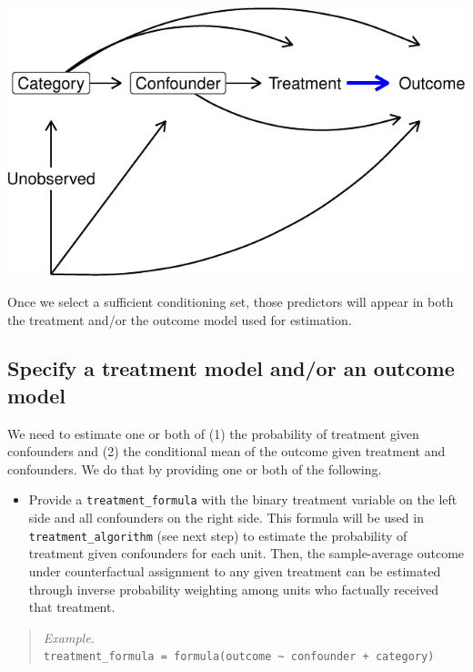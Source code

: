 \documentclass[
]{article}
\providecommand{\tightlist}{%
  \setlength{\itemsep}{0pt}\setlength{\parskip}{0pt}}
\begin{document}
\includegraphics{github_doc_files/figure-latex/unnamed-chunk-18-1.pdf}

Once we select a sufficient conditioning set, those predictors will appear in both the treatment and/or the outcome model used for estimation.

\hypertarget{specify-a-treatment-model-andor-an-outcome-model}{%
\subsection{Specify a treatment model and/or an outcome model}\label{specify-a-treatment-model-andor-an-outcome-model}}

We need to estimate one or both of (1) the probability of treatment given confounders and (2) the conditional mean of the outcome given treatment and confounders. We do that by providing one or both of the following.

\begin{itemize}
\tightlist
\item
  Provide a \texttt{treatment\_formula} with the binary treatment variable on the left side and all confounders on the right side. This formula will be used in \texttt{treatment\_algorithm} (see next step) to estimate the probability of treatment given confounders for each unit. Then, the sample-average outcome under counterfactual assignment to any given treatment can be estimated through inverse probability weighting among units who factually received that treatment.
\end{itemize}

\begin{quote}
\emph{Example.}\\
\texttt{treatment\_formula\ =\ formula(outcome\ \textasciitilde{}\ confounder\ +\ category)}
\end{quote}
\end{document}
